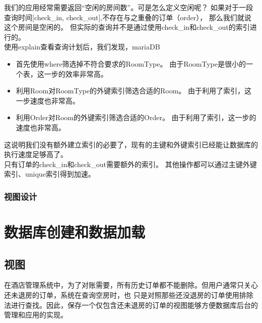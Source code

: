 \documentclass{myreport}
\begin{document}
我们的应用经常需要返回``空闲的房间数''。可是怎么定义空闲呢？
如果对于一段查询时间[check\_in, check\_out],不存在与之重叠的订单（order），
那么我们就说这个房间是空闲的。
但实际的查询并不是通过使用check\_in和check\_out的索引进行的。\\

使用explain查看查询计划后，我们发现，mariaDB
\begin{itemize}
    \item 首先使用where筛选掉不符合要求的RoomType。
    由于RoomType是很小的一个表，这一步的效率非常高。
    \item 利用Room对RoomType的外键索引筛选合适的Room。
    由于利用了索引，这一步速度也非常高。
    \item 利用Order对Room的外键索引筛选合适的Order。
    由于利用了索引，这一步的速度也非常高。
\end{itemize}
  
这说明我们没有额外建立索引的必要了，现有的主键和外键索引已经能让数据库的执行速度足够高了。\\


只有订单的check\_in和check\_out需要额外的索引。
其他操作都可以通过主键外键索引、unique索引得到加速。\\
\subsection{视图设计}

\chapter{数据库创建和数据加载}
\section{视图}
在酒店管理系统中，为了对账需要，所有历史订单都不能删除。但用户通常只关心还未退房的订单，系统在查询空房时，也
只是对照那些还没退房的订单使用排除法进行查找。因此，保存一个仅包含还未退房的订单的视图能够方便数据库后台的管理和应用的实现。
\end{document}
